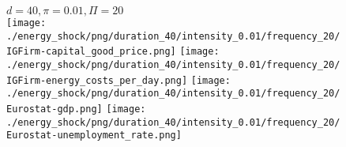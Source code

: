 \begin{figure}[ht!]
\centering\leavevmode
\begin{minipage}{17cm}
\centering\leavevmode
{$d=40, \pi=0.01, \Pi=20$}\\
\texttt{[image: ./energy\_shock/png/duration\_40/intensity\_0.01/frequency\_20/IGFirm-capital\_good\_price.png]}
\texttt{[image: ./energy\_shock/png/duration\_40/intensity\_0.01/frequency\_20/IGFirm-energy\_costs\_per\_day.png]}
\texttt{[image: ./energy\_shock/png/duration\_40/intensity\_0.01/frequency\_20/Eurostat-gdp.png]}
\texttt{[image: ./energy\_shock/png/duration\_40/intensity\_0.01/frequency\_20/Eurostat-unemployment\_rate.png]}
\end{minipage}
\end{figure}

